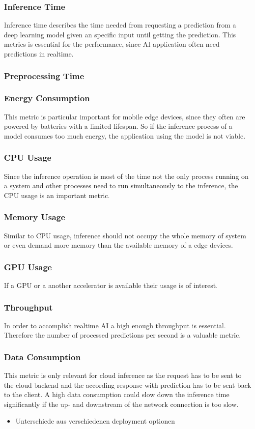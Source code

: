 \subsubsection{Inference Time}
Inference time describes the time needed from requesting a prediction from a deep learning model given an specific input until getting the prediction.
This metrics is essential for the performance, since AI application often need predictions in realtime.
\subsubsection{Preprocessing Time}
\subsubsection{Energy Consumption}
This metric is particular important for mobile edge devices, since they often are powered by batteries with a limited lifespan. So if the inference process of a model consumes too much energy, the application using the model is not viable.
\subsubsection{CPU Usage}
Since the inference operation is most of the time not the only process running on a system and other processes need to run simultaneously to the inference, the CPU usage is an important metric.
\subsubsection{Memory Usage}
Similar to CPU usage, inference should not occupy the whole memory of system or even demand more memory than the available memory of a edge devices.
\subsubsection{GPU Usage}
If a GPU or a another accelerator is available their usage is of interest.
\subsubsection{Throughput}
In order to accomplish realtime AI a high enough throughput is essential. Therefore the number of processed predictions per second is a valuable metric.
\subsubsection{Data Consumption}
This metric is only relevant for cloud inference as the request has to be sent to the cloud-backend and the according response with prediction has to be sent back to the client. A high data consumption could slow down the inference time significantly if the up- and downstream of the network connection is too slow. 
\begin{itemize}
    \item Unterschiede aus verschiedenen deployment optionen
\end{itemize}


\endinput 
